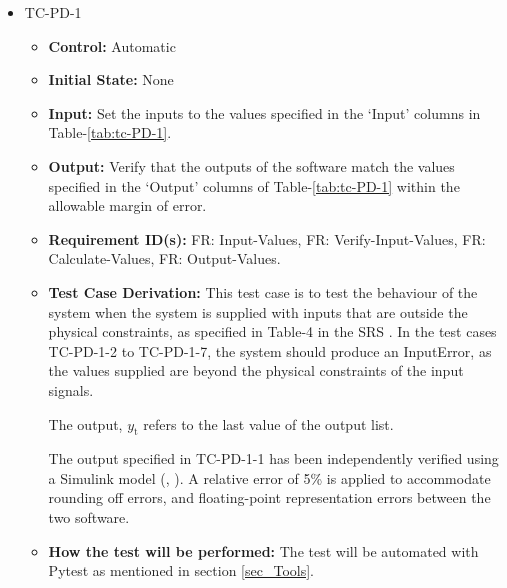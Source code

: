 \documentclass[12pt, titlepage]{article}
\begin{document}
\begin{itemize}
\item{TC-PD-1\\}
\begin{itemize}

\item{\textbf{Control:}} Automatic
					
\item{\textbf{Initial State:}} None
					
\item{\textbf{Input:}} Set the inputs to the values specified in the `Input' columns 
in Table-\ref{tab:tc-PD-1}.
					
\item{\textbf{Output:}}  Verify that the outputs of the software match the 
values specified in the `Output' columns of Table-\ref{tab:tc-PD-1} within the
allowable margin of error.


\item{\textbf{Requirement ID(s):}}  FR: Input-Values, FR: Verify-Input-Values, FR: Calculate-Values, FR: Output-Values.

\item{\textbf{Test Case Derivation:}}  This test case is to test the behaviour of the system 
when the system is supplied with inputs that are outside the physical constraints, as specified in Table-4
in the SRS \cite {SRS}. In the test cases TC-PD-1-2 to TC-PD-1-7, the system should produce an InputError, as
the values supplied are beyond the physical constraints of the input signals.

The output, ${y_{\text{t}}}$ refers to the last value of the output list.

The output specified in TC-PD-1-1 has been independently verified using a Simulink model (\cite{Simulink}, 
\cite{PD_Controller}). A relative error of 5\% is applied to accommodate rounding off errors,
and floating-point representation errors between the two software.

					
\item{\textbf{How the test will be performed:}}  The test will be automated with Pytest as mentioned in 
section \ref{sec_Tools}. 
					
\end{itemize}
\end{itemize}
\end{document}
